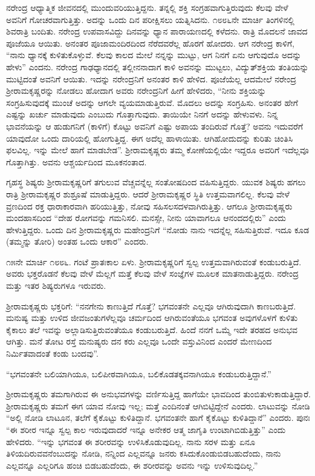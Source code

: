 ನರೇಂದ್ರ ಆಧ್ಯಾತ್ಮಿಕ ಜೀವನದಲ್ಲಿ ಮುಂದುವರಿಯುತ್ತಿದ್ದನು. ತನ್ನಲ್ಲಿ ಶಕ್ತಿ ಸಂಗ್ರಹವಾಗುತ್ತಿರುವುದು ಕೆಲವು ವೇಳೆ ಅವನಿಗೆ ಗೋಚರವಾಗುತ್ತಿತ್ತು. ಅದನ್ನು ಒಂದು ದಿನ ಪರೀಕ್ಷಿಸಲು ಯತ್ನಿಸಿದನು. ೧೮೮೬ನೇ ಮಾರ್ಚಿ ತಿಂಗಳಿನಲ್ಲಿ ಶಿವರಾತ್ರಿ ಬಂದಿತು. ನರೇಂದ್ರ ಉಪವಾಸವಿದ್ದು ದಿನವನ್ನು ಧ್ಯಾನ ಪಾರಾಯಣದಲ್ಲಿ ಕಳೆದನು. ರಾತ್ರಿ ಮೊದಲನೆ ಜಾವದ ಪೂಜೆಯೂ ಆಯಿತು. ಅನಂತರ ಪೂಜಾಮಂದಿರದಿಂದ ನೆರೆದವರೆಲ್ಲ ಹೊರಗೆ ಹೋದರು. ಆಗ ನರೇಂದ್ರ ಕಾಳಿಗೆ, “ನಾನು ಧ್ಯಾನಕ್ಕೆ ಕುಳಿತುಕೊಳ್ಳುವೆ. ಕೆಲವು ಕಾಲದ ಮೇಲೆ ನನ್ನನ್ನು ಮುಟ್ಟು, ಆಗ ನಿನಗೆ ಏನು ಆಗುವುದೊ ಅದನ್ನು ಹೇಳು” ಎಂದನು. ನರೇಂದ್ರ ಗಾಢಧ್ಯಾನದಲ್ಲಿ ತಲ್ಲೀನನಾದಾಗ ಕಾಳಿ ಅವನನ್ನು ಮುಟ್ಟಲು, ವಿದ್ಯುತ್‍ಶಕ್ತಿಯ ತಂತಿಯನ್ನು ಮುಟ್ಟಿದಂತೆ ಅವನಿಗೆ ಆಯಿತು. ಇದನ್ನು ನರೇಂದ್ರನಿಗೆ ಅನಂತರ ಕಾಳಿ ಹೇಳಿದ. ಪೂಜೆಯೆಲ್ಲ ಆದಮೇಲೆ ನರೇಂದ್ರ ಶ‍್ರೀರಾಮಕೃಷ್ಣರನ್ನು ನೋಡಲು ಹೋದಾಗ ಅವರು ನರೇಂದ್ರನಿಗೆ ಹೀಗೆ ಹೇಳಿದರು, “ನೀನು ಶಕ್ತಿಯನ್ನು ಸಂಗ್ರಹಿಸುವುದಕ್ಕೆ ಮುಂಚೆ ಅದನ್ನು ಆಗಲೇ ವ್ಯಯಮಾಡುತ್ತಿರುವೆ. ಮೊದಲು ಅದನ್ನು ಸಂಗ್ರಹಿಸು. ಅನಂತರ ಹೇಗೆ ಎಷ್ಟನ್ನು ಖರ್ಚು ಮಾಡುವುದು ಎಂಬುದು ಗೊತ್ತಾಗುವುದು. ತಾಯಿಯೇ ನಿನಗೆ ಅದನ್ನು ಹೇಳುವಳು. ನಿನ್ನ ಭಾವನೆಯನ್ನು ಆ ಹುಡುಗನಿಗೆ (ಕಾಳಿಗೆ) ಕೊಟ್ಟು ಅವನಿಗೆ ಎಷ್ಟು ಅಪಾಯ ತಂದಿರುವೆ ಗೊತ್ತೆ? ಅವನು ಇದುವರೆಗೆ ಯಾವುದೋ ಒಂದು ದಾರಿಯಲ್ಲಿ ಹೋಗುತ್ತಿದ್ದ. ಈಗ ಅದೆಲ್ಲ ಹಾಳಾಯಿತು. ಆಗಿಹೋದುದನ್ನು ಕುರಿತು ಚಿಂತಿಸಿ ಫಲವಿಲ್ಲ. ಇನ್ನು ಮೇಲೆ ಹಾಗೆ ಮಾಡಬೇಡ”. ಶ‍್ರೀರಾಮಕೃಷ್ಣರು ತಮ್ಮ ಕೋಣೆಯಲ್ಲಿಯೇ ಇದ್ದರೂ ಅವರಿಗೆ ಇದೆಲ್ಲವೂ ಗೊತ್ತಾಗಿತ್ತು. ಅವನು ಆಶ್ಚರ್ಯದಿಂದ ಮೂಕನಂತಾದ.

ಗೃಹಸ್ಥ ಶಿಷ್ಯರು ಶ‍್ರೀರಾಮಕೃಷ್ಣರಿಗೆ ತಗುಲುವ ವೆಚ್ಚವನ್ನೆಲ್ಲ ಸಂತೋಷದಿಂದ ವಹಿಸುತ್ತಿದ್ದರು. ಯುವಕ ಶಿಷ್ಯರು ಹಗಲು ರಾತ್ರಿ ಶ‍್ರೀರಾಮಕೃಷ್ಣರ ಶುಶ್ರೂಷೆ ಮಾಡುತ್ತಿದ್ದರು. ಆದರೆ ಶ‍್ರೀರಾಮಕೃಷ್ಣರ ಸ್ಥಿತಿ ಉತ್ತಮವಾಗಲಿಲ್ಲ. ಕೆಲವು ವೇಳೆ ವ್ರಣದಿಂದ ರಕ್ತ ಧಾರಾಕಾರವಾಗಿ ಹರಿಯುತ್ತಿತ್ತು, ನೋವು ಸಹಿಸಲಸದಳವಾಗಿರುತ್ತಿತ್ತು. ಆಗಲೂ ಶ‍್ರೀರಾಮಕೃಷ್ಣರು ಮಂದಹಾಸದಿಂದ “ದೇಹ ರೋಗವನ್ನು ಗಮನಿಸಲಿ. ಮನಸ್ಸೇ, ನೀನು ಯಾವಾಗಲೂ ಆನಂದದಲ್ಲಿರು” ಎಂದು ಹೇಳುತ್ತಿದ್ದರು. ಒಂದು ದಿನ ಶ‍್ರೀರಾಮಕೃಷ್ಣರು ಮಹೇಂದ್ರನಿಗೆ “ನೋಡು ನಾನು ಇದನ್ನೆಲ್ಲ ಸಹಿಸುತ್ತಿರುವೆ. ಇದೂ ಕೂಡ (ತಮ್ಮನ್ನು ತೋರಿ) ಅಂತಹ ಒಂದು ಆಕಾರ” ಎಂದರು.

೧೫ನೇ ಮಾರ್ಚಿ ೧೮೮೬. ಗಂಟೆ ಪ್ರಾತಃಕಾಲ ಏಳು. ಶ‍್ರೀರಾಮಕೃಷ್ಣರಿಗೆ ಸ್ವಲ್ಪ ಉತ್ತಮವಾಗಿರುವಂತೆ ಕಂಡುಬರುತ್ತಿದೆ. ಅವರು ಭಕ್ತರೊಡನೆ ಕೆಲವು ವೇಳೆ ಮೆಲ್ಲಗೆ ಮತ್ತೆ ಕೆಲವು ವೇಳೆ ಸಂಜ್ಞೆಗಳ ಮೂಲಕ ಮಾತನಾಡುತ್ತಿದ್ದರು. ನರೇಂದ್ರ ಮತ್ತು ಇತರ ಶಿಷ್ಯರುಗಳೂ ಇರುವರು.

ಶ‍್ರೀರಾಮಕೃಷ್ಣರು ಭಕ್ತರಿಗೆ: “ನನಗೇನು ಕಾಣುತ್ತಿದೆ ಗೊತ್ತೆ? ಭಗವಂತನೇ ಎಲ್ಲವೂ ಆಗಿರುವುದಾಗಿ ಕಾಣಬರುತ್ತಿದೆ. ಮನುಷ್ಯ ಮತ್ತು ಉಳಿದ ಜೀವಜಂತುಗಳೆಲ್ಲವೂ ಚರ್ಮದಿಂದ ಆಗಿರುವಂತೆಯೂ ಭಗವಂತ ಅವುಗಳೊಳಗೆ ಕುಳಿತು ಕೈಕಾಲು ತಲೆ ಇವನ್ನು ಅಲ್ಲಾಡಿಸುತ್ತಿರುವಂತೆಯೂ ಕಂಡುಬರುತ್ತಿದೆ. ಹಿಂದೆ ನನಗೆ ಒಮ್ಮೆ ಇದೇ ತರಹದ ಅನುಭವ ಆಗಿತ್ತು. ಮನೆ ತೋಟ ರಸ್ತೆ ಮನುಷ್ಯರು ದನ ಕರು ಎಲ್ಲವೂ ಒಂದೇ ವಸ್ತುವಿನಿಂದ ಎಂದರೆ ಮೇಣದಿಂದ ನಿರ್ಮಿತವಾದಂತೆ ಕಂಡು ಬಂದವು”.

“ಭಗವಂತನೇ ಬಲಿಯಾಗಿಯೂ, ಬಲಿಪೀಠವಾಗಿಯೂ, ಬಲಿಕೊಡತಕ್ಕವನಾಗಿಯೂ ಕಂಡುಬರುತ್ತಿದ್ದಾನೆ.”

ಶ‍್ರೀರಾಮಕೃಷ್ಣರು ತಮಗಾಗಿರುವ ಈ ಅನುಭವಗಳನ್ನು ವರ್ಣಿಸುತ್ತಿದ್ದ ಹಾಗೆಯೇ ಭಾವದಿಂದ ತುಂಬಿತುಳುಕಾಡುತ್ತಿದ್ದಾರೆ. ಶ‍್ರೀರಾಮಕೃಷ್ಣರು ತಮಗೆ ಈಗ ಯಾವ ನೋವು ಇಲ್ಲ; ಮತ್ತೆ ಎಂದಿನಂತೆ ಆಗಿಬಿಟ್ಟಿದ್ದೇನೆ ಎಂದರು. ಲಾಟುವನ್ನು ನೋಡಿ “ಅಲ್ಲಿ ನೋಡಿ ಲಾಟೂನ, ತಲೆಗೆ ಕೈಕೊಟ್ಟು ಕುಳಿತಿದ್ದಾನೆ. ಭಗವಂತನೇ ಹಾಗೆ ಕೈಕೊಟ್ಟು ಕುಳಿತಿದ್ದಾನೆ” ಎಂದರು. ಪುನಃ “ಈ ಶರೀರ ಇನ್ನೂ ಸ್ವಲ್ಪ ಕಾಲ ಇರುವುದಾದರೆ ಇನ್ನೂ ಅನೇಕರ ಆತ್ಮ ಜಾಗೃತಿ ಉಂಟಾಗಿಬಿಡುತ್ತಿತ್ತು” ಎಂದು ಹೇಳಿದರು. “ಇನ್ನು ಭಗವಂತ ಈ ಶರೀರವನ್ನು ಉಳಿಸಿಕೊಡುವುದಿಲ್ಲ. ನಾನು ಸರಳ ಮತ್ತು ಏನೂ ತಿಳಿಯದಿರುವವನೆಂಬುದನ್ನು ನೋಡಿ, ನನ್ನಿಂದ ಎಲ್ಲವನ್ನೂ ಜನರು ಕಸಿದುಕೊಂಡುಬಿಡಬಹುದೆಂದು, ನಾನು ಎಲ್ಲವನ್ನೂ ಎಲ್ಲರಿಗೂ ಹಂಚಿ ಬಿಡಬಹುದೆಂದು, ಈ ಶರೀರವನ್ನು ಅವನು ಇನ್ನು ಉಳಿಸುವುದಿಲ್ಲ.”

